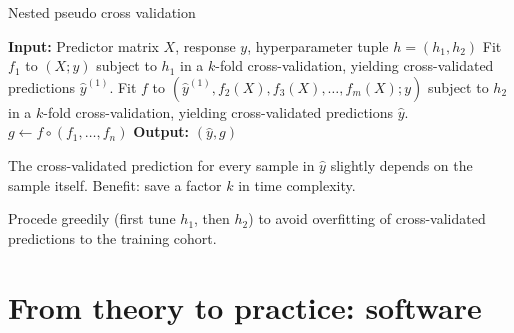 \documentclass[10pt, aspectratio=169]{beamer}
\begin{document}
\begin{frame}{}
  \begin{algorithm}[H]
    \caption{Nested pseudo cross validation} \label{alg:nested-pcv}
    \begin{algorithmic}[1]
      \State \textbf{Input:} Predictor matrix $X$, response $y$, 
        hyperparameter tuple $h = (h_1, h_2)$
      \State Fit $f_1$ to $(X; y)$ subject to $h_1$ in a $k$-fold cross-validation, 
        yielding cross-validated predictions $\hat{y}^{(1)}$.
      \State Fit $f$ to $(\hat{y}^{(1)}, f_2(X), f_3(X), \ldots, f_m(X); y)$ 
        subject to $h_2$ in a $k$-fold cross-validation, yielding 
        cross-validated predictions $\hat{y}$.
      \State $g \gets f \circ (f_1, \ldots, f_n)$
      \State \textbf{Output:} $(\hat{y}, g)$
    \end{algorithmic}
  \end{algorithm}

The  cross-validated prediction for every sample in $\hat{y}$ slightly 
depends on the sample itself. Benefit: save a factor $k$ in time complexity.

Procede greedily (first tune $h_1$, then $h_2$) to avoid 
overfitting of cross-validated predictions to the training cohort.
\end{frame}

\section{From theory to practice: software}
\end{document}
